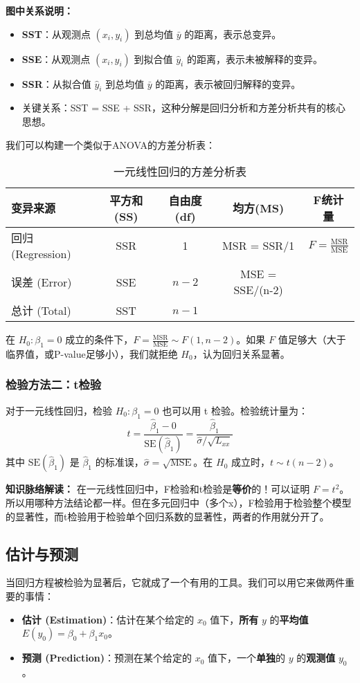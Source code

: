 \documentclass[12pt, a4paper]{amsart}
\begin{document}
\textbf{图中关系说明：}
\begin{itemize}
    \item \textbf{SST}：从观测点 $(x_i, y_i)$ 到总均值 $\bar{y}$ 的距离，表示总变异。
    \item \textbf{SSE}：从观测点 $(x_i, y_i)$ 到拟合值 $\hat{y}_i$ 的距离，表示未被解释的变异。
    \item \textbf{SSR}：从拟合值 $\hat{y}_i$ 到总均值 $\bar{y}$ 的距离，表示被回归解释的变异。
    \item 关键关系：SST = SSE + SSR，这种分解是回归分析和方差分析共有的核心思想。
\end{itemize}

我们可以构建一个类似于ANOVA的方差分析表：
\begin{table}[h!]
\centering
\caption{一元线性回归的方差分析表}
\begin{tabular}{lcccc}
\toprule
\textbf{变异来源} & \textbf{平方和(SS)} & \textbf{自由度(df)} & \textbf{均方(MS)} & \textbf{F统计量} \\
\midrule
回归 (Regression) & SSR & 1 & MSR = SSR/1 & $F = \frac{\text{MSR}}{\text{MSE}}$ \\
误差 (Error) & SSE & $n-2$ & MSE = SSE/(n-2) & \\
\midrule
总计 (Total) & SST & $n-1$ & & \\
\bottomrule
\end{tabular}
\end{table}

在 $H_0: \beta_1=0$ 成立的条件下，$F = \frac{\text{MSR}}{\text{MSE}} \sim F(1, n-2)$。如果 $F$ 值足够大（大于临界值，或P-value足够小），我们就拒绝 $H_0$，认为回归关系显著。

\subsubsection{检验方法二：t检验}
对于一元线性回归，检验 $H_0: \beta_1 = 0$ 也可以用 t 检验。检验统计量为：
$$ t = \frac{\hat{\beta}_1 - 0}{\text{SE}(\hat{\beta}_1)} = \frac{\hat{\beta}_1}{\hat{\sigma}/\sqrt{L_{xx}}} $$
其中 $\text{SE}(\hat{\beta}_1)$ 是 $\hat{\beta}_1$ 的标准误，$\hat{\sigma} = \sqrt{\text{MSE}}$。在 $H_0$ 成立时，$t \sim t(n-2)$。

\textbf{知识脉络解读：} 在一元线性回归中，F检验和t检验是\textbf{等价}的！可以证明 $F = t^2$。所以用哪种方法结论都一样。但在多元回归中（多个x），F检验用于检验整个模型的显著性，而t检验用于检验单个回归系数的显著性，两者的作用就分开了。

\subsection{估计与预测}
当回归方程被检验为显著后，它就成了一个有用的工具。我们可以用它来做两件重要的事情：
\begin{itemize}
    \item \textbf{估计 (Estimation)}：估计在某个给定的 $x_0$ 值下，\textbf{所有} $y$ 的\textbf{平均值} $E(y_0) = \beta_0 + \beta_1 x_0$。
    \item \textbf{预测 (Prediction)}：预测在某个给定的 $x_0$ 值下，一个\textbf{单独}的 $y$ 的\textbf{观测值} $y_0$。
\end{itemize}
\end{document}
